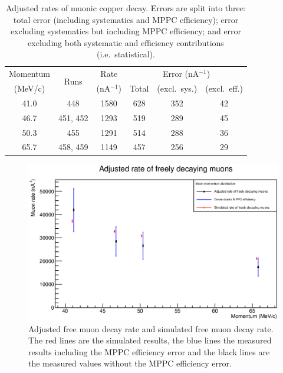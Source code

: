 \begin{table}
  \begin{center}
  \begin{tabular}{c | c | c | c | c | c}
    Momentum  & \multirow{2}{*}{Runs}  &  Rate           &  \multicolumn{3}{c}{Error (nA\(^{-1}\))}   \\
     (MeV/c)  &                        &  (nA\(^{-1}\))  &  Total  &  (excl.\ sys.)  &  (excl.\ eff.) \\
    \hline
    41.0  &       448  &  1580  &  628  &  352  &  42  \\
    46.7  &  451, 452  &  1293  &  519  &  289  &  45  \\
    50.3  &       455  &  1291  &  514  &  288  &  36  \\
    65.7  &  458, 459  &  1149  &  457  &  256  &  29  \\
  \end{tabular}
  \end{center}
  \caption{Adjusted rates of muonic copper decay. Errors are split into three: total error (including systematics and MPPC efficiency); error excluding systematics but including MPPC efficiency; and error excluding both systematic and efficiency contributions (i.e.\ statistical).}
  \label{tab:adjusted_cu_rates}
\end{table}

\begin{figure}[hptb] 
  \centering
    \includegraphics[width=\textwidth]{images/plot_generating_scripts/adjusted_muon_rates.eps}
  \caption{Adjusted free muon decay rate and simulated free muon decay rate. The red lines are the simulated results, the blue lines the measured results including the MPPC efficiency error and the black lines are the measured values without the MPPC efficiency error.}
  \label{fig:images_plot_generating_scripts_adjusted_muon_rates}
\end{figure}

